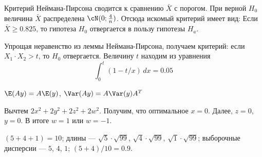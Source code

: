 \begin{solution}{21.8}
Критерий Неймана-Пирсона сводится к сравнению $\bar X$ с порогом. При верной $H_0$ величина $\bar X$ распределена $\cN(0; \frac{4}{n})$.
Отсюда искомый критерий имеет вид:
Если $\bar X  \geqslant 0.825$, то гипотеза ${H_0}$ отвергается в пользу гипотезы ${H_a}$.
\end{solution}
\begin{solution}{21.9}
  Упрощая неравенство из леммы Неймана-Пирсона, получаем критерий: если $X_1\cdot X_2 >t$, то $H_0$ отвергается. Величину $t$ находим из уравнения
\[
\int_0^t (1 - t/x) \, dx = 0.05
\]
\end{solution}
\begin{solution}{21.10}

\end{solution}
\begin{solution}{21.11}
\end{solution}
\begin{solution}{22.1}
$\E(Ay)=A\E(y)$, $\Var(Ay)=A\Var(y)A^T$
\end{solution}
\begin{solution}{22.2}

\end{solution}
\begin{solution}{22.3}

\end{solution}
\begin{solution}{22.4}

\end{solution}
\begin{solution}{22.5}

\end{solution}
\begin{solution}{22.6}

\end{solution}
\begin{solution}{23.1}
Вычтем $2x^2 + 2y^2 + 2z^2 + 2w^2$. Получим, что оптимальное $x=0$. Далее, $z=0$, $y=0$. В итоге $w=1$ или $w=-1$.
\end{solution}
\begin{solution}{23.2}

\end{solution}
\begin{solution}{23.3}
\end{solution}
\begin{solution}{23.4}
\end{solution}
\begin{solution}{23.5}
$(5+4+1)=10$; длины — $\sqrt{5}\cdot\sqrt{99}$, $\sqrt{4}\cdot\sqrt{99}$, $\sqrt{1}\cdot\sqrt{99}$; выборочные дисперсии — $5$, $4$, $1$; $(5+4)/10=0.9$.
\end{solution}
